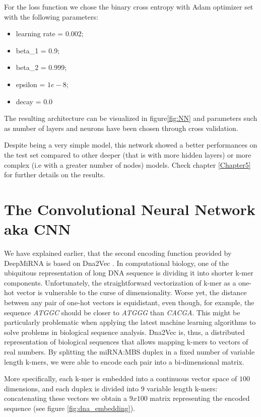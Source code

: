 For the loss function we chose the binary cross entropy with Adam optimizer set with the following parameters:

\begin{itemize}
	\item learning rate = 0.002;
	\item beta\_1 = 0.9;
	\item beta\_2 = 0.999;
	\item epsilon = $1e-8$;
	\item decay = 0.0
\end{itemize}

The resulting architecture can be visualized in figure\ref{fig:NN} and parameters such as number of layers and neurons have been chosen through cross validation.

Despite being a very simple model, this network showed a better performances on the test set compared to other deeper (that is with more hidden layers) or more complex (i.e with a greater number of nodes) models. Check chapter \ref{Chapter5} for further details on the results.

\section{The Convolutional Neural Network aka CNN}
We have explained earlier, that the second encoding function provided by DeepMiRNA is based on Dna2Vec \cite{dna_distributed_repr}. In computational biology, one of the ubiquitous representation of long DNA sequence is dividing it into shorter k-mer components.  Unfortunately, the straightforward vectorization of k-mer as a one-hot vector is vulnerable to the curse of dimensionality. Worse yet, the distance between any pair of one-hot vectors is equidistant, even though, for example, the sequence \emph{ATGGC} should be closer to \emph{ATGGG} than \emph{CACGA}. This might be particularly problematic when applying the latest machine learning algorithms to solve problems in biological sequence analysis. Dna2Vec is, thus, a distributed representation of biological sequences that allows mapping k-mers to vectors of real numbers. By splitting the miRNA:MBS duplex in a fixed number of variable length k-mers, we were able to encode each pair into a bi-dimensional matrix. 

More specifically, each k-mer is embedded into a continuous vector space of $100$ dimensions, and each duplex is divided into 9 variable length k-mers: concatenating these vectors we obtain a $9x100$ matrix representing the encoded sequence (see figure \ref{fig:dna_embedding}).

